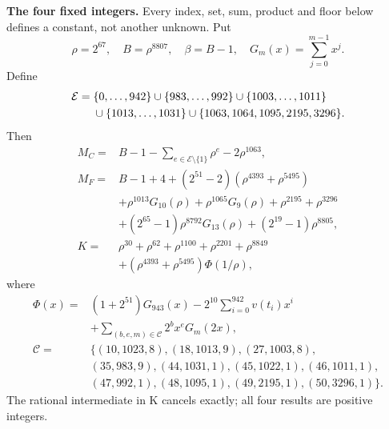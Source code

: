 \documentclass[11pt]{article}
\theoremstyle{remark}
\begin{document}
\textbf{The four fixed integers.}
Every index, set, sum, product and floor below defines a constant, not
another unknown. Put
\[
\rho=2^{67},\quad B=\rho^{8807},\quad\beta=B-1,\quad
G_m(x)=\sum_{j=0}^{m-1}x^j.
\]
Define
\[
\begin{split}
\mathcal E={}&\{0,\ldots,942\}\cup\{983,\ldots,992\}\cup\{1003,\ldots,1011\}\\
&\cup\{1013,\ldots,1031\}\cup\{1063,1064,1095,2195,3296\}.
\end{split}
\]
Then
\begin{align*}
M_C={}&B-1-\sum_{e\in\mathcal E\setminus\{1\}}\rho^e-2\rho^{1063},\\
M_F={}&B-1+4+(2^{51}-2)(\rho^{4393}+\rho^{5495})\\
&+\rho^{1013}G_{10}(\rho)+\rho^{1065}G_9(\rho)
  +\rho^{2195}+\rho^{3296}\\
&+(2^{65}-1)\rho^{8792}G_{13}(\rho)+(2^{19}-1)\rho^{8805},\\
K={}&\rho^{30}+\rho^{62}+\rho^{1100}+\rho^{2201}+\rho^{8849}\\
&+(\rho^{4393}+\rho^{5495})\Phi(1/\rho),
\end{align*}
where
\[
\begin{split}
\Phi(x)={}&(1+2^{51})G_{943}(x)
 -2^{10}\sum_{i=0}^{942}v(t_i)x^i\\
&+\sum_{(b,e,m)\in\mathcal C}2^b x^e G_m(2x),\\
\mathcal C={}&\{(10,1023,8),(18,1013,9),(27,1003,8),\\
&(35,983,9),(44,1031,1),(45,1022,1),(46,1011,1),\\
&(47,992,1),(48,1095,1),(49,2195,1),(50,3296,1)\}.
\end{split}
\]
The rational intermediate in K cancels exactly; all four results are positive integers.
\end{document}
